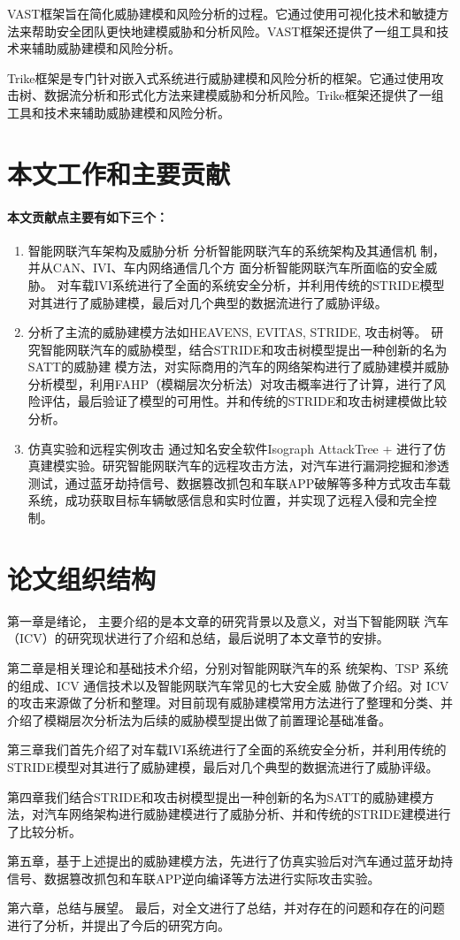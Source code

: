 VAST\cite{shostack2015vast}框架旨在简化威胁建模和风险分析的过程。它通过使用可视化技术和敏捷方法来帮助安全团队更快地建模威胁和分析风险。VAST框架还提供了一组工具和技术来辅助威胁建模和风险分析。

Trike框架\cite{larrondo2013trike}是专门针对嵌入式系统进行威胁建模和风险分析的框架。它通过使用攻击树、数据流分析和形式化方法来建模威胁和分析风险。Trike框架还提供了一组工具和技术来辅助威胁建模和风险分析。
\section{本文工作和主要贡献}
\paragraph{本文贡献点主要有如下三个：}

\begin{enumerate}
    \item 智能网联汽车架构及威胁分析 
    分析智能网联汽车的系统架构及其通信机
    制，并从CAN、IVI、车内网络通信几个方
    面分析智能网联汽车所面临的安全威胁。
    对车载IVI系统进行了全面的系统安全分析，并利用传统的STRIDE模型对其进行了威胁建模，最后对几个典型的数据流进行了威胁评级。
    \item 分析了主流的威胁建模方法如HEAVENS, EVITAS, STRIDE, 攻击树等。
    研究智能网联汽车的威胁模型，结合STRIDE和攻击树模型提出一种创新的名为SATT的威胁建
模方法，对实际商用的汽车的网络架构进行了威胁建模并威胁分析模型，利用FAHP（模糊层次分析法）对攻击概率进行了计算，进行了风险评估，最后验证了模型的可用性。并和传统的STRIDE和攻击树建模做比较分析。
    \item 仿真实验和远程实例攻击
    通过知名安全软件Isograph AttackTree + 进行了仿真建模实验。研究智能网联汽车的远程攻击方法，对汽车进行漏洞挖掘和渗透测试，通过蓝牙劫持信号、数据篡改抓包和车联APP破解等多种方式攻击车载系统，成功获取目标车辆敏感信息和实时位置，并实现了远程入侵和完全控制。
\end{enumerate}


\section{论文组织结构}
第一章是绪论， 主要介绍的是本文章的研究背景以及意义，对当下智能网联
汽车（ICV）的研究现状进行了介绍和总结，最后说明了本文章节的安排。

第二章是相关理论和基础技术介绍，分别对智能网联汽车的系
统架构、TSP 系统的组成、ICV 通信技术以及智能网联汽车常见的七大安全威
胁做了介绍。对 ICV 的攻击来源做了分析和整理。对目前现有威胁建模常用方法进行了整理和分类、并介绍了模糊层次分析法为后续的威胁模型提出做了前置理论基础准备。

第三章我们首先介绍了对车载IVI系统进行了全面的系统安全分析，并利用传统的STRIDE模型对其进行了威胁建模，最后对几个典型的数据流进行了威胁评级。

第四章我们结合STRIDE和攻击树模型提出一种创新的名为SATT的威胁建模方法，对汽车网络架构进行威胁建模进行了威胁分析、并和传统的STRIDE建模进行了比较分析。

第五章，基于上述提出的威胁建模方法，先进行了仿真实验后对汽车通过蓝牙劫持信号、数据篡改抓包和车联APP逆向编译等方法进行实际攻击实验。

第六章，总结与展望。
最后，对全文进行了总结，并对存在的问题和存在的问题进行了分析，并提出了今后的研究方向。
